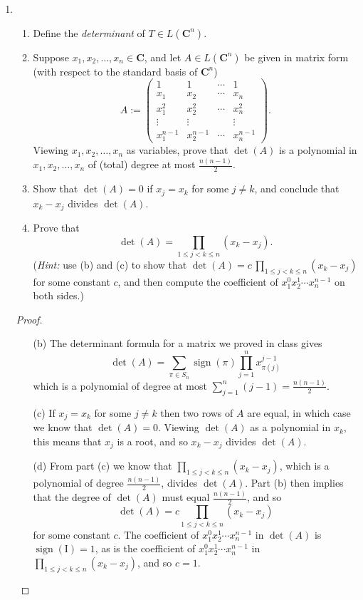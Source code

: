 \documentclass[12pt]{amsart}
\def\Id{\mathrm I}
\def\C{\mathbf{C}}
\newcommand\sign{\operatorname{sign}}
\begin{document}
\begin{enumerate}
\item 
  \begin{enumerate} 
  \item Define the \emph{determinant} of $T \in L(\C^n)$.
  \item Suppose $x_1, x_2, \dots, x_n \in \C$, and let $A \in L(\C^n)$ be given in matrix form (with respect to the standard basis of $\C^n$)
\[
  A := \left( \begin{array}{cccccccccccc}
  1 & 1 & \cdots & 1 \\
  x_1 & x_2 & \cdots & x_n \\
  x_1^2 & x_2^2 & \cdots & x_n^2 \\
  \vdots & \vdots &        & \vdots \\
  x_1^{n-1} & x_2^{n-1} & \cdots & x_n^{n-1}
  \end{array} \right) .
\]
  Viewing $x_1, x_2, \dots, x_n$ as variables, prove that $\det(A)$ is a polynomial in $x_1, x_2, \dots, x_n$ of (total) degree at most $\frac{ n(n-1) }{ 2 }$.
  \item Show that $\det(A) = 0$ if $x_j = x_k$ for some $j \ne k$, and conclude that $x_k - x_j$ divides $\det(A)$.
  \item Prove that
\[
  \det(A) = \prod_{ 1 \le j < k \le n } \left( x_k - x_j \right) .
\]
  (\emph{Hint:} use (b) and (c) to show that $\det(A) = c \, \prod_{ 1 \le j < k \le n } \left( x_k - x_j \right)$ for some constant $c$, and then compute the coefficient of $x_1^0 x_2^1 \cdots x_n^{ n-1 }$ on both sides.)

  \end{enumerate}

\begin{proof}
\begin{enumerate} 

\item[(b)] The determinant formula for a matrix we proved in class gives
\[
  \det(A) = \sum_{ \pi \in S_n } \sign(\pi) \prod_{ j=1 }^n x_{ \pi(j) }^{j-1}
\]
which is a polynomial of degree at most $\sum_{ j=1 }^{ n } (j-1) = \frac{ n(n-1) }{ 2 }$.

\item[(c)] If $x_j = x_k$ for some $j \ne k$ then two rows of $A$ are equal, in which case we know that $\det(A) = 0$.
Viewing $\det(A)$ as a polynomial in $x_k$, this means that $x_j$ is a root, and so $x_k - x_j$ divides $\det(A)$.

\item[(d)] From part (c) we know that $\prod_{ 1 \le j < k \le n } \left( x_k - x_j \right)$, which is a polynomial of degree $\frac{ n(n-1) }{ 2 }$, divides $\det(A)$.
Part (b) then implies that the degree of $\det(A)$ must equal $\frac{ n(n-1) }{ 2 }$, and so
\[
  \det(A) = c \prod_{ 1 \le j < k \le n } \left( x_k - x_j \right)
\]
for some constant $c$.
The coefficient of $x_1^0 x_2^1 \cdots x_n^{ n-1 }$ in $\det(A)$ is $\sign(\Id) = 1$, as is
the coefficient of $x_1^0 x_2^1 \cdots x_n^{ n-1 }$ in $\prod_{ 1 \le j < k \le n } \left( x_k - x_j \right)$, and so $c=1$. \qedhere


\end{enumerate}
\end{proof}
\end{enumerate}
\end{document}
